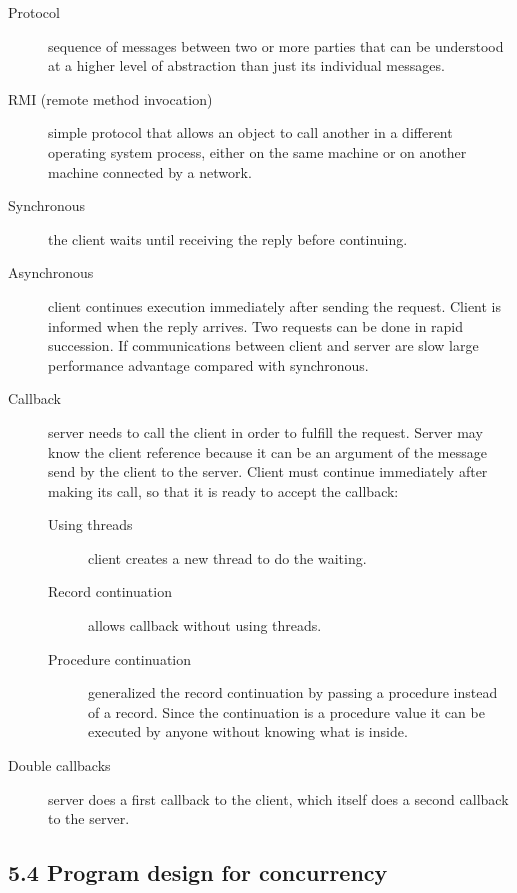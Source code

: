 \begin{description}
  \item[Protocol] sequence of messages between two or more parties that can be understood at a higher level of abstraction than just its individual messages.
  \item[RMI (remote method invocation)] simple protocol that allows an object to call another in a different operating system process, either on the same machine or on another machine connected by a network.
  \item[Synchronous] the client waits until receiving the reply before continuing.
  \item[Asynchronous] client continues execution immediately after sending the request.
    Client is informed when the reply arrives.
    Two requests can be done in rapid succession.
    If communications between client and server are slow large performance advantage compared with synchronous.
  \item[Callback] server needs to call the client in order to fulfill the request.
    Server may know the client reference because it can be an argument of the message send by the client to the server.
    Client must continue immediately after making its call, so that it is ready to accept the callback:
    \begin{description}
      \item[Using threads] client creates a new thread to do the waiting.
      \item[Record continuation] allows callback without using threads.
      \item[Procedure continuation] generalized the record continuation by passing a procedure instead of a record.
        Since the continuation is a procedure value it can be executed by anyone without knowing what is inside.
    \end{description}
  \item[Double callbacks] server does a first callback to the client, which itself does a second callback to the server.
\end{description}

\subsection{5.4 Program design for concurrency}

